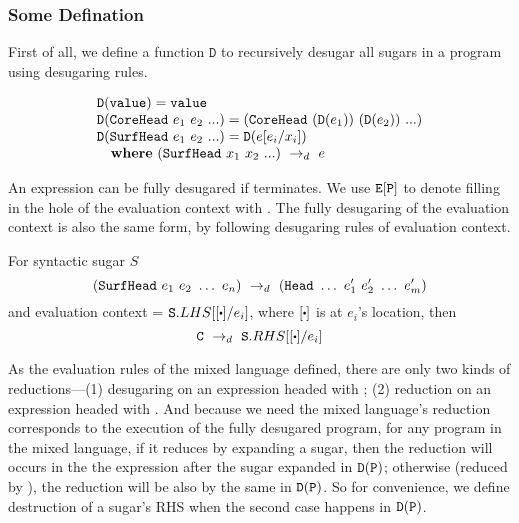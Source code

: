 \subsubsection{Some Defination}
First of all, we define a function $\mathtt{D}$ to recursively desugar all sugars in a program using desugaring rules.

\begin{Def}
\[
\begin{array}{lll}
	\mathtt{D}(\texttt{value}) = \texttt{value}\\
	\mathtt{D}(\texttt{CoreHead}~e_1~e_2~ ...) = (\texttt{CoreHead}~(\mathtt{D}(e_1))~(\mathtt{D}(e_2))~...)\\
	\mathtt{D}(\texttt{SurfHead}~e_1~e_2~ ...) = \mathtt{D}(e[e_i/x_i])\\
\quad \mbox{\bf where}~(\texttt{SurfHead}~x_1~x_2~ ...) ~\rightarrow_d~ e

\end{array}
\]

\end{Def}


An expression  can be fully desugared if  terminates. We use $\mbox{\tt E}[\mbox{\tt P}]$ to denote filling in the hole of the evaluation context  with .  The fully desugaring of the evaluation context is also the same form, by following desugaring rules of evaluation context.

\begin{Def}
	For syntactic sugar $S$
	\[
	(\mbox{\tt SurfHead}~e_1~e_2~\ldots~e_n) ~\rightarrow_d~ (\mbox{\tt Head}~\ldots~e_1'~e_2'~\ldots~e_m')
	\]
	and evaluation context  = $\m{S}.LHS[[\bigcdot]/e_i]$, where $[\bigcdot]$ is at $e_i$'s location, then
	\[
	\drule{\m{C}}{\m{S}.RHS[[\bigcdot]/e_i]}
	\]

\end{Def}
As the evaluation rules of the mixed language defined, there are only two kinds of reductions---(1) desugaring on an expression headed with ; (2) reduction on an expression headed with . And because we need the mixed language's reduction corresponds to the execution of the fully desugared program, for any program  in the mixed language, if it reduces by expanding a sugar, then the reduction will occurs in the the expression after the sugar expanded in $\mathtt{D}(\mbox{\tt P})$; otherwise (reduced by ), the reduction will be also by the same  in $\mathtt{D}(\mbox{\tt P})$.
So for convenience, we define destruction of a sugar's RHS when the second case happens in $\mathtt{D}(\mbox{\tt P})$.

